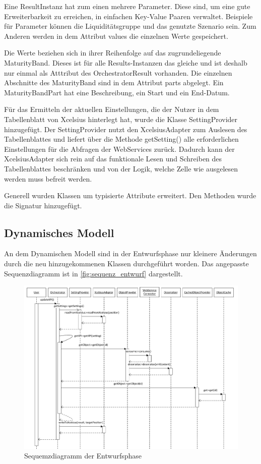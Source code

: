 Eine ResultInstanz hat zum einen mehrere Parameter. Diese sind, um eine gute Erweiterbarkeit zu erreichen, in einfachen Key-Value Paaren verwaltet. Beispiele für Parameter können die Liquiditätsgruppe und das genutzte Szenario sein. Zum Anderen werden in dem Attribut values die einzelnen Werte gespeichert.

Die Werte beziehen sich in ihrer Reihenfolge auf das zugrundeliegende MaturityBand. Dieses ist für alle Results-Instanzen das gleiche und ist deshalb nur einmal als Atttribut des OrchestratorResult vorhanden. Die einzelnen Abschnitte des MaturityBand sind in dem Attribut parts abgelegt. Ein MaturityBandPart hat eine Beschreibung, ein Start und ein End-Datum.

Für das Ermitteln der aktuellen Einstellungen, die der Nutzer in dem Tabellenblatt von Xcelsius hinterlegt hat, wurde die Klasse SettingProvider hinzugefügt. Der SettingProvider nutzt den XcelsiusAdapter zum Auslesen des Tabellenblattes und liefert über die Methode getSetting() alle erforderlichen Einstellungen für die Abfragen der WebServices zurück. Dadurch kann der XcelsiusAdapter sich rein auf das funktionale Lesen und Schreiben des Tabellenblattes beschränken und von der Logik, welche Zelle wie ausgelesen werden muss befreit werden.

Generell wurden Klassen um typisierte Attribute erweitert. Den Methoden wurde die Signatur hinzugefügt.

\subsection{Dynamisches Modell}

An dem Dynamischen Modell sind in der Entwurfsphase nur kleinere Änderungen durch die neu hinzugekommenen Klassen durchgeführt worden. Das angepasste Sequenzdiagramm ist in \vref{fig:sequenz_entwurf} dargestellt.

\begin{figure}[h]
\centering
\setlength{\unitlength}{1mm}
\includegraphics[width=15cm]{Visio/Entwurf-Sequenz.pdf}
\caption{Sequemzdiagramm der Entwurfsphase\label{fig:sequenz_entwurf}}
\end{figure}

